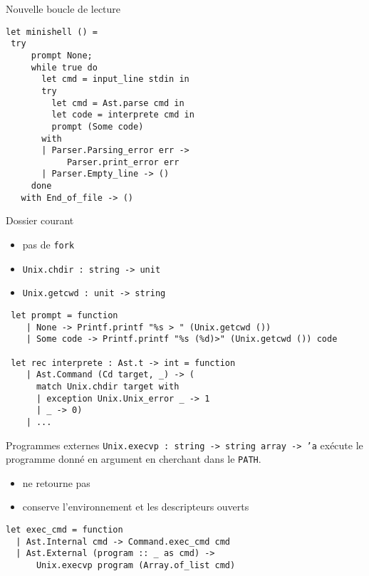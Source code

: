 \begin{frame}[fragile]{Nouvelle boucle de lecture}
\begin{lstlisting}
let minishell () =
 try
     prompt None;
     while true do
       let cmd = input_line stdin in
       try
         let cmd = Ast.parse cmd in
         let code = interprete cmd in
         prompt (Some code)
       with
       | Parser.Parsing_error err -> 
            Parser.print_error err
       | Parser.Empty_line -> ()
     done
   with End_of_file -> ()
\end{lstlisting}
\end{frame}

\begin{frame}[fragile]{Dossier courant}
 \begin{itemize}[label=$-$]
     \item pas de \texttt{fork} 
     \item \texttt{Unix.chdir : string -> unit}
     \item \texttt{Unix.getcwd : unit -> string}
 \end{itemize}
 \begin{lstlisting}
 let prompt = function
    | None -> Printf.printf "%s > " (Unix.getcwd ())
    | Some code -> Printf.printf "%s (%d)>" (Unix.getcwd ()) code 
 
 let rec interprete : Ast.t -> int = function
    | Ast.Command (Cd target, _) -> (
      match Unix.chdir target with 
      | exception Unix.Unix_error _ -> 1 
      | _ -> 0)
    | ...
 \end{lstlisting}
\end{frame}

\begin{frame}[fragile]{Programmes externes}
\texttt{Unix.execvp : string -> string array -> 'a} exécute le programme donné en argument en cherchant dans le \texttt{PATH}.
\begin{itemize}[label=$-$]
    \item ne retourne pas
    \item conserve l'environnement et les descripteurs ouverts
\end{itemize}
\begin{lstlisting}
let exec_cmd = function
  | Ast.Internal cmd -> Command.exec_cmd cmd
  | Ast.External (program :: _ as cmd) ->
      Unix.execvp program (Array.of_list cmd)
\end{lstlisting}
\end{frame}

